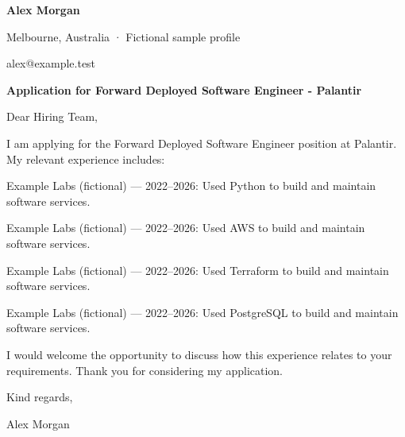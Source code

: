 \documentclass[10pt,a4paper]{article}
\begin{document}
{\LARGE\bfseries\color{navy} Alex Morgan}\par
Melbourne, Australia · Fictional sample profile\par
alex@example.test\par
{\large\bfseries\color{navy} Application for Forward Deployed Software Engineer - Palantir}\par
Dear Hiring Team,\par
I am applying for the Forward Deployed Software Engineer position at Palantir. My relevant experience includes:\par
Example Labs (fictional) — 2022–2026: Used Python to build and maintain software services.\par
Example Labs (fictional) — 2022–2026: Used AWS to build and maintain software services.\par
Example Labs (fictional) — 2022–2026: Used Terraform to build and maintain software services.\par
Example Labs (fictional) — 2022–2026: Used PostgreSQL to build and maintain software services.\par
I would welcome the opportunity to discuss how this experience relates to your requirements. Thank you for considering my application.\par
Kind regards,\par
Alex Morgan\par
\end{document}

